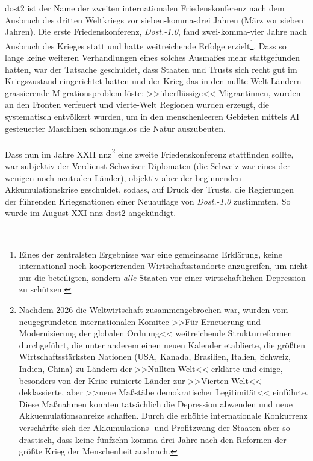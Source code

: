 \ac{dost2} ist der Name der zweiten internationalen
Friedenskonferenz nach dem Ausbruch des dritten Weltkriegs vor sieben-komma-drei
Jahren (März vor sieben Jahren).
Die erste Friedenskonferenz, \emph{Dost.-1.0}, fand zwei-komma-vier Jahre nach
Ausbruch des Krieges statt und hatte weitreichende Erfolge erzielt\footnote{
  Eines der zentralsten Ergebnisse war eine gemeinsame Erklärung, keine
  international noch kooperierenden Wirtschaftsstandorte anzugreifen, um nicht
  nur die beteiligten, sondern \emph{alle} Staaten vor einer wirtschaftlichen
  Depression zu schützen.
}.
Dass so lange keine weiteren Verhandlungen eines solches Ausmaßes mehr
stattgefunden hatten, war der Tatsache geschuldet, dass Staaten und Trusts sich
recht gut im Kriegszustand eingerichtet hatten und der Krieg das in den
nullte-Welt Ländern grassierende Migrationsproblem löste: >>überflüssige<<
Migrantinnen, wurden an den Fronten verfeuert und vierte-Welt Regionen wurden
erzeugt, die systematisch entvölkert wurden, um in den menschenleeren Gebieten
mittels AI gesteuerter Maschinen schonungslos die Natur auszubeuten.\\\\
Dass nun im Jahre XXII \ac{nnz}\footnote{
  Nachdem 2026 die Weltwirtschaft zusammengebrochen war, wurden vom
  neugegründeten internationalen Komitee >>Für Erneuerung und Modernisierung der
  globalen Ordnung<< weitreichende Strukturreformen durchgeführt, die
  unter anderem einen neuen Kalender etablierte, die größten
  Wirtschaftsstärksten Nationen (USA, Kanada, Brasilien, Italien, Schweiz,
  Indien, China) zu Ländern der >>Nullten Welt<< erklärte und einige, besonders
  von der Krise ruinierte Länder zur >>Vierten Welt<< deklassierte, aber >>neue
  Maßstäbe demokratischer Legitimität<< einführte.
  Diese Maßnahmen konnten tatsächlich die Depression abwenden und neue
  Akkuemulationsanreize schaffen. 
  Durch die erhöhte internationale Konkurrenz verschärfte sich der
  Akkumulations- und Profitzwang der Staaten aber so drastisch, dass keine
  fünfzehn-komma-drei Jahre nach den Reformen der größte Krieg der Menschenheit
  ausbrach.
} eine zweite Friedenskonferenz stattfinden sollte, war subjektiv der Verdienst
Schweizer Diplomaten (die Schweiz war eines der wenigen noch neutralen Länder),
objektiv aber der beginnenden Akkumulationskrise geschuldet, sodass, auf Druck
der Trusts, die Regierungen der führenden Kriegsnationen einer Neuauflage von
\emph{Dost.-1.0} zustimmten. 
So wurde im August XXI \ac{nnz} \ac{dost2} angekündigt.\\\\
